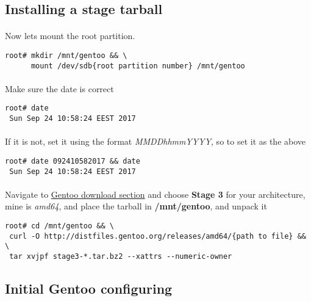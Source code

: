 \documentclass[10pt,a4paper]{article}
\begin{document}
        \newpage
        \subsection{Installing a stage tarball}
            \paragraph{} Now lets mount the root partition.

\begin{lstlisting}[style=BashInputRoot]
root# mkdir /mnt/gentoo && \
      mount /dev/sdb{root partition number} /mnt/gentoo
\end{lstlisting}

            \paragraph{} Make sure the date is correct

\begin{lstlisting}[style=BashInputRoot]
root# date
 Sun Sep 24 10:58:24 EEST 2017
\end{lstlisting}

            \paragraph{} If it is not, set it using the format \textit{MMDDhhmmYYYY}, so to set it as the above

\begin{lstlisting}[style=BashInputRoot]
root# date 092410582017 && date
 Sun Sep 24 10:58:24 EEST 2017
\end{lstlisting}

            \paragraph{} Navigate to \href{https://www.gentoo.org/downloads/}{Gentoo download section} and choose \textbf{Stage 3} for your architecture, mine is \textit{amd64}, and place the tarball in \textbf{/mnt/gentoo}, and unpack it

\begin{lstlisting}[style=BashInputRoot]
root# cd /mnt/gentoo && \
 curl -O http://distfiles.gentoo.org/releases/amd64/{path to file} && \
 tar xvjpf stage3-*.tar.bz2 --xattrs --numeric-owner
\end{lstlisting}

        \newpage
        \subsection{Initial Gentoo configuring}
\end{document}
